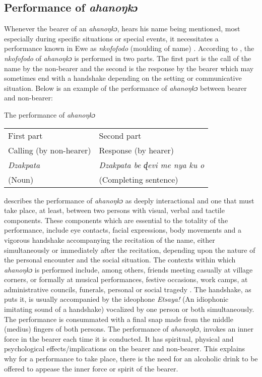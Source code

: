 \documentclass[output=paper]{langscibook}
\begin{document}
\subsection{Performance of {\textit{ahanoŋkɔ}}}
Whenever the bearer of an {\textit{ahanoŋkɔ}}, hears his name being mentioned, most especially during specific situations or special events, it necessitates a performance known in Ewe as \textit{nkofofodo} (moulding of name) \citep{avorgbedor1983psycho, geurts2006enduring, nyamuame2013history}. According to \citet{avorgbedor1983psycho}, the {\textit{nkofofodo}} of {\textit{ahanoŋkɔ}} is performed in two parts. The first part is the call of the name by the non-bearer and the second is the response by the bearer which may sometimes end with a handshake depending on the setting or communicative situation.  
Below is an example of the performance of {\textit{ahanoŋkɔ}} between bearer and non-bearer:

\ea The performance of {\textit{ahanoŋkɔ}}\\
\begin{tabular}{@{}ll@{}}
First part & Second part\\
Calling (by non-hearer) & Response (by hearer)\\
\itshape Dzakpata & \itshape Dzakpata be ɖevi me nya ku o\\
(Noun) & (Completing sentence)\\
\end{tabular}
\z

\citet{avorgbedor1983psycho} describes the performance of {\textit{ahanoŋkɔ}} as deeply interactional and one that must take place, at least, between two persons with visual, verbal and tactile components. These components which are essential to the totality of the performance, include eye contacts, facial expressions, body movements and a vigorous handshake accompanying the recitation of the name, either simultaneously or immediately after the recitation, depending upon the nature of the personal encounter and the social situation. The contexts within which {\textit{ahanoŋkɔ}} is performed include, among others, friends meeting casually at village corners, or formally at musical performances, festive occasions, work camps, at administrative councils, funerals, personal or social tragedy \citep{avorgbedor1983psycho}.
The handshake, as \citet{avorgbedor1983psycho}  puts it, is usually accompanied by the ideophone \textit{Etsaya!} (An idiophonic imitating sound of a handshake) vocalized by one person or both simultaneously. The performance is consummated with a final snap made from the middle (medius) fingers of both persons. The performance of {\textit{ahanoŋkɔ}}, invokes an inner force in the bearer each time it is conducted. It has spiritual, physical and psychological effects/implications on the bearer and non-bearer. This explains why for a performance to take place, there is the need for an alcoholic drink to be offered to appease the inner force or spirit of the bearer.
\end{document}
